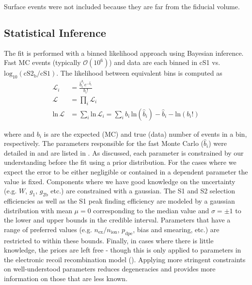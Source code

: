 Surface events were not included because they are far from the fiducial volume.



\subsection{Statistical Inference}
\label{subsec:er_nr_calibrations_parameter_determ_mc_match}
The fit is performed with a binned likelihood approach using Bayesian inference.  Fast MC events (typically $\mathcal{O}(10^6)$) and
data are each binned in cS1 vs. $\mathrm{log_{10}(cS2_b / cS1)}$.  The likelihood between equivalent bins \li is computed as
\begin{subequations}
\begin{align}
\mathcal{L}_i &=\frac{\hat{b}_{i}^{b_i} e^{-\hat{b}_{i}}}{b_{i}!} \\
\mathcal{L} &= \prod_i \mathcal{L}_i \\
\mathrm{ln}\, \mathcal{L} &= \sum_i \mathrm{ln}\, \mathcal{L}_i = \sum_i b_i\, \mathrm{ln} (\hat{b}_i) - \hat{b}_i - \mathrm{ln} (b_i !)
\end{align}
\end{subequations}

\noindent where \bhi and $b_i$ is are the expected (MC) and true (data) number of events in a bin, respectively.  The parameters
responsible for the fast Monte Carlo ($\hat{b}_i$) were detailed in
and are listed in
.  As discussed, each parameter is constrained by our understanding before
the fit using a prior distribution.  For the cases where we expect the error to be either negligible or contained in a dependent parameter
the value is fixed.  Components where we have good knowledge on the uncertainty (e.g. $W$, $g_1$, $g_{2\mathrm{b}}$ etc.) are constrained
with a gaussian.  The S1 and S2 selection efficiencies as well as the S1 peak finding efficiency are modeled by a gaussian
distribution with
mean $\mu = 0$ corresponding to the median value and $\sigma = \pm 1$ to the lower and upper bounds in the credible interval.  Parameters
that have a range of preferred values (e.g. $n_{\mathrm{ex}} / n_{\mathrm{ion}}$, $p_{\mathrm{dpe}}$,
bias and smearing, etc.) are restricted to within these bounds.  Finally, in cases where there is little knowledge, the priors
are left free - though this is only applied to parameters in the electronic recoil recombination model
().  Applying more stringent constraints on well-understood parameters reduces
degeneracies and provides more information on those that are less known.

